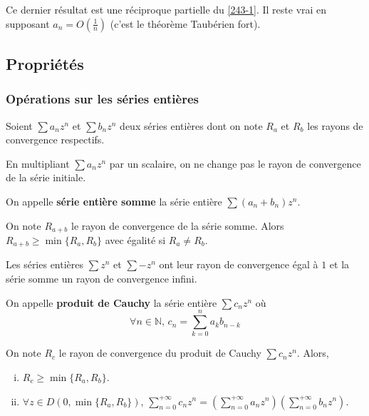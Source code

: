 	\begin{remark}
		Ce dernier résultat est une réciproque partielle du \cref{243-1}. Il reste vrai en supposant $a_n = O \left( \frac{1}{n} \right)$ (c'est le théorème Taubérien fort).
	\end{remark}
	
	\subsection{Propriétés}
	
	\subsubsection{Opérations sur les séries entières}
	
	
	Soient $\sum a_n z^n$ et $\sum b_n z^n$ deux séries entières dont on note $R_a$ et $R_b$ les rayons de convergence respectifs.
	
	\begin{proposition}
		En multipliant $\sum a_n z^n$ par un scalaire, on ne change pas le rayon de convergence de la série initiale.
	\end{proposition}
	
	\begin{definition}
		On appelle \textbf{série entière somme} la série entière $\sum (a_n + b_n) z^n$.
	\end{definition}
	
	\begin{proposition}
		On note $R_{a+b}$ le rayon de convergence de la série somme. Alors $R_{a+b} \geq \min \{R_a, R_b\}$ avec égalité si $R_a \neq R_b$.
	\end{proposition}
	
	
	\begin{example}
		Les séries entières $\sum z^n$ et $\sum -z^n$ ont leur rayon de convergence égal à $1$ et la série somme un rayon de convergence infini.
	\end{example}
	
	
	\begin{definition}
		On appelle \textbf{produit de Cauchy} la série entière $\sum c_n z^n$ où
		\[ \forall n \in \mathbb{N}, \, c_n = \sum_{k=0}^n a_k b_{n-k} \]
	\end{definition}
	
	\begin{proposition}
		On note $R_{c}$ le rayon de convergence du produit de Cauchy $\sum c_n z^n$. Alors,
		\begin{enumerate}[(i)]
			\item $R_c \geq \min \{R_a, R_b\}$.
			\item $\forall z \in D(0, \min \{R_a, R_b\}), \, \sum_{n = 0}^{+\infty} c_n z^n = (\sum_{n = 0}^{+\infty} a_n z^n) (\sum_{n = 0}^{+\infty} b_n z^n)$.
		\end{enumerate}
	\end{proposition}
	
